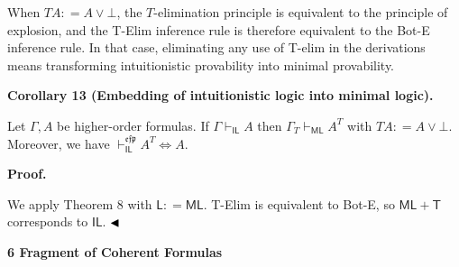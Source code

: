 \documentclass[10pt,a4paper]{article}
\begin{document}
 
 
When $TA\mathrel{\mathop{:}}=A\mathbin{\vee}\bot$, the $T$-elimination principle is equivalent to the principle of explosion, and the T-Elim inference rule is therefore equivalent to the Bot-E inference rule. In that case, eliminating any use of T-elim in the derivations means transforming intuitionistic provability into minimal provability.\par
 
 
 
\par\medskip\noindent\textbf{Corollary 13 (Embedding of intuitionistic logic into minimal logic).}\par
 
 
Let $\Gamma,A$ be higher-order formulas. If $\Gamma\vdash_{\mathsf{IL}}A$ then $\Gamma_{T}\vdash_{\mathsf{ML}}A^{T}$ with $TA\mathrel{\mathop{:}}=A\mathbin{\vee}\bot$. Moreover, we have $\vdash_{\mathsf{IL}}^{\mathfrak{e}\mathfrak{f}\mathfrak{p}}A^{T}\Leftrightarrow
A$.\par
 
 
 
 
 
\par\medskip\noindent\textbf{Proof.}\par
 
 
We apply Theorem 8 with $\mathsf{L}\mathrel{\mathop{:}}=\mathsf{ML}$. T-Elim is equivalent to Bot-E, so $\mathsf{ML}+\mathsf{T}$ corresponds to $\mathsf{IL}$. $\hfill\blacktriangleleft$\par
 
 
 


 
\par\medskip\noindent\textbf{6 Fragment of Coherent Formulas}\par
 
 
\end{document}
